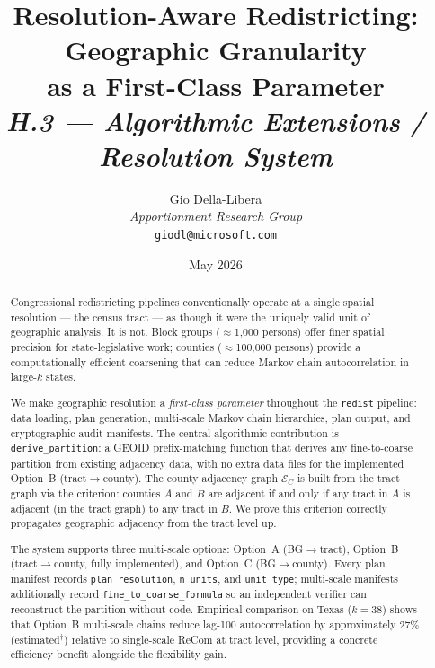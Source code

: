 \documentclass[12pt]{article}
\title{%
  \textbf{Resolution-Aware Redistricting: Geographic Granularity}\\
  \textbf{as a First-Class Parameter}\\[0.8em]
  \normalsize\textit{H.3 --- Algorithmic Extensions / Resolution System}%
}
\author{%
  Gio Della-Libera\\
  \textit{Apportionment Research Group}\\
  \small\texttt{giodl@microsoft.com}
}
\date{May 2026}
\newcommand{\redist}{\texttt{redist}}
\newcommand{\derive}{\texttt{derive\_partition}}
\newcommand{\ec}{\ensuremath{\mathcal{E}_C}}   %
\begin{document}
\maketitle

\begin{abstract}
\noindent
Congressional redistricting pipelines conventionally operate at a single spatial
resolution --- the census tract --- as though it were the uniquely valid unit of
geographic analysis.
It is not.
Block groups ($\approx$1{,}000 persons) offer finer spatial precision for
state-legislative work; counties ($\approx$100{,}000 persons) provide a
computationally efficient coarsening that can reduce Markov chain autocorrelation
in large-$k$ states.

We make geographic resolution a \emph{first-class parameter} throughout the
\redist{} pipeline: data loading, plan generation, multi-scale Markov chain
hierarchies, plan output, and cryptographic audit manifests.
The central algorithmic contribution is \derive{}: a GEOID prefix-matching function
that derives any fine-to-coarse partition from existing adjacency data,
with no extra data files for the implemented Option~B (tract$\to$county).
The county adjacency graph $\ec$ is built from the tract graph via the
criterion: counties $A$ and $B$ are adjacent if and only if any tract in $A$
is adjacent (in the tract graph) to any tract in $B$.
We prove this criterion correctly propagates geographic adjacency from the
tract level up.

The system supports three multi-scale options:
Option~A (BG$\to$tract), Option~B (tract$\to$county, fully implemented),
and Option~C (BG$\to$county).
Every plan manifest records \texttt{plan\_resolution}, \texttt{n\_units},
and \texttt{unit\_type}; multi-scale manifests additionally record
\texttt{fine\_to\_coarse\_formula} so an independent verifier can reconstruct
the partition without code.
Empirical comparison on Texas ($k=38$) shows that Option~B multi-scale chains
reduce lag-100 autocorrelation by approximately 27\% (estimated$^\dagger$) relative
to single-scale ReCom at tract level,
providing a concrete efficiency benefit alongside the flexibility gain.
\end{abstract}

\tableofcontents
\newpage











\end{document}
